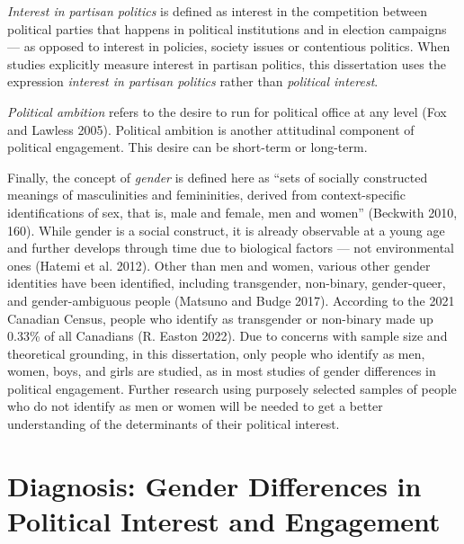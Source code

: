 \documentclass[
  letterpaper,
  DIV=11,
  numbers=noendperiod]{scrreprt}
\begin{document}
\emph{Interest in partisan politics} is defined as interest in the
competition between political parties that happens in political
institutions and in election campaigns --- as opposed to interest in
policies, society issues or contentious politics. When studies
explicitly measure interest in partisan politics, this dissertation uses
the expression \emph{interest in partisan politics} rather than
\emph{political interest}.

\emph{Political ambition} refers to the desire to run for political
office at any level (Fox and Lawless 2005). Political ambition is
another attitudinal component of political engagement. This desire can
be short-term or long-term.

Finally, the concept of \emph{gender} is defined here as ``sets of
socially constructed meanings of masculinities and femininities, derived
from context-specific identifications of sex, that is, male and female,
men and women'' (Beckwith 2010, 160). While gender is a social
construct, it is already observable at a young age and further develops
through time due to biological factors --- not environmental ones
(Hatemi et al. 2012). Other than men and women, various other gender
identities have been identified, including transgender, non-binary,
gender-queer, and gender-ambiguous people (Matsuno and Budge 2017).
According to the 2021 Canadian Census, people who identify as
transgender or non-binary made up 0.33\% of all Canadians (R. Easton
2022). Due to concerns with sample size and theoretical grounding, in
this dissertation, only people who identify as men, women, boys, and
girls are studied, as in most studies of gender differences in political
engagement. Further research using purposely selected samples of people
who do not identify as men or women will be needed to get a better
understanding of the determinants of their political interest.

\hypertarget{diagnosis-gender-differences-in-political-interest-and-engagement}{%
\section{Diagnosis: Gender Differences in Political Interest and
Engagement}\label{diagnosis-gender-differences-in-political-interest-and-engagement}}
\end{document}
